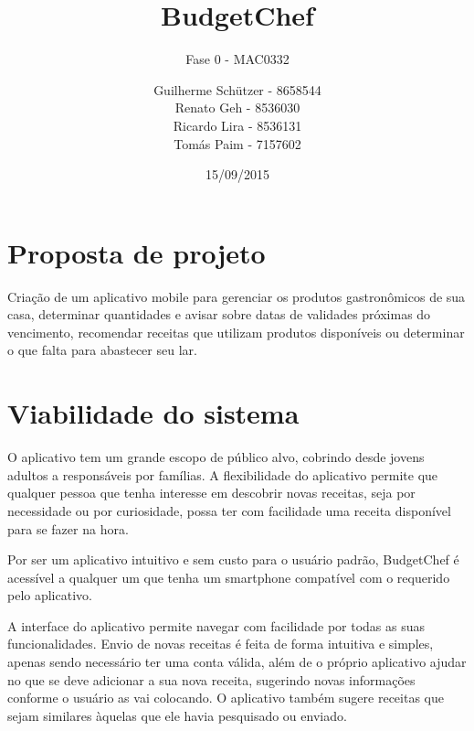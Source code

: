 \documentclass[a4paper]{article}
\title{BudgetChef}
\subtitle{Fase 0 - MAC0332}
\author{
	Guilherme Schützer - 8658544\\
	Renato Geh - 8536030\\
	Ricardo Lira - 8536131\\
	Tomás Paim - 7157602\\
}
\date{15/09/2015}
\begin{document}
\maketitle

\section{Proposta de projeto}

Criação de um aplicativo mobile para gerenciar os produtos gastronômicos de sua casa, determinar quantidades e avisar sobre datas de validades próximas do vencimento, recomendar receitas que utilizam produtos disponíveis ou determinar o que falta para abastecer seu lar.

\section{Viabilidade do sistema}

O aplicativo tem um grande escopo de público alvo, cobrindo desde jovens adultos a responsáveis por famílias. A flexibilidade do aplicativo permite que qualquer pessoa que tenha interesse em descobrir novas receitas, seja por necessidade ou por curiosidade, possa ter com facilidade uma receita disponível para se fazer na hora.

\par Por ser um aplicativo intuitivo e sem custo para o usuário padrão, BudgetChef é acessível a qualquer um que tenha um smartphone compatível com o requerido pelo aplicativo.

\par A interface do aplicativo permite navegar com facilidade por todas as suas funcionalidades. Envio de novas receitas é feita de forma intuitiva e simples, apenas sendo necessário ter uma conta válida, além de o próprio aplicativo ajudar no que se deve adicionar a sua nova receita, sugerindo novas informações conforme o usuário as vai colocando. O aplicativo também sugere receitas que sejam similares àquelas que ele havia pesquisado ou enviado.
\end{document}
